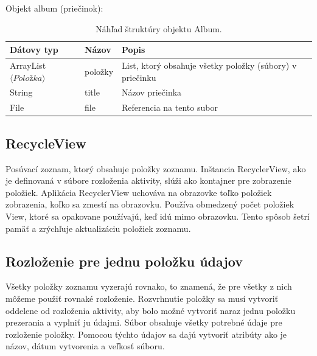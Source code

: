 \documentclass[12pt, oneside]{book}
\begin{document}
\begin{table}[H]

Objekt album (priečinok):
\begin{center}
\begin{tabularx}{1\textwidth} { 
  | >{\raggedright\arraybackslash}X 
  | >{\raggedright\arraybackslash}X 
  | >{\raggedright\arraybackslash}X | }
  \hline
 \textbf{Dátovy typ}  & \textbf{Názov} & \textbf{Popis} \\
 \hline
ArrayList$\langle Položka \rangle$ & položky & List, ktorý obsahuje všetky položky (súbory) v priečinku \\
 \hline
String  & title & Názov priečinka  \\
 \hline
File  & file & Referencia na tento subor  \\
  \hline

\end{tabularx}
\caption{Náhľad štruktúry objektu Album. }
\end{center}
\end{table}

\subsection{RecycleView}
\label{sec:recycleView}

\hspace{15pt} Posúvací zoznam, ktorý obsahuje položky zoznamu. Inštancia RecyclerView, ako je definovaná v súbore rozloženia aktivity, slúži ako kontajner pre zobrazenie položiek. Aplikácia RecyclerView uchováva na obrazovke toľko položiek zobrazenia, koľko sa zmestí na obrazovku. Používa obmedzený počet položiek View, ktoré sa opakovane používajú, keď idú mimo obrazovku. Tento spôsob šetrí pamäť a zrýchľuje aktualizáciu položiek zoznamu.

\subsection{Rozloženie pre jednu položku údajov}

\hspace{15pt} Všetky položky zoznamu vyzerajú rovnako, to znamená, že pre všetky z nich môžeme použiť rovnaké rozloženie. Rozvrhnutie položky sa musí vytvoriť oddelene od rozloženia aktivity, aby bolo možné vytvoriť naraz jednu položku prezerania a vyplniť ju údajmi. Súbor obsahuje všetky potrebné údaje pre rozloženie položky. Pomocou týchto údajov sa dajú vytvoriť atribúty ako je názov, dátum vytvorenia a veľkosť súboru.
\end{document}
